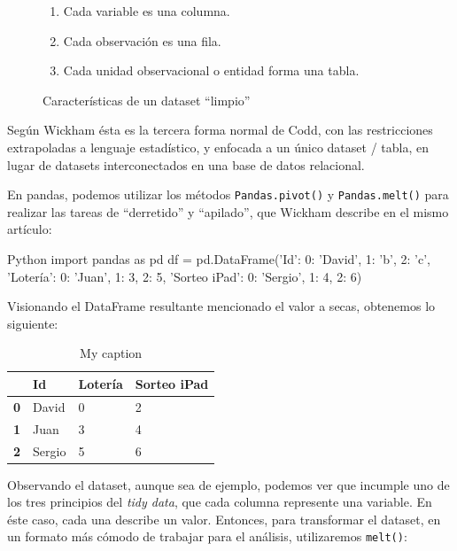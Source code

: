 \begin{figure}[ht!]
  \begin{enumerate}
  \item Cada variable es una columna.
  \item Cada observación es una fila.
  \item Cada unidad observacional o entidad forma una tabla.
  \end{enumerate}
  \caption{\label{fig:tidy-data-characteristics} Características de un
    dataset ``limpio''}
\end{figure}

Según Wickham ésta es la tercera forma normal de Codd, con las restricciones
extrapoladas a lenguaje estadístico, y enfocada a un único dataset / tabla, en
lugar de datasets interconectados en una base de datos relacional.

En pandas, podemos utilizar los métodos \texttt{Pandas.pivot()} y
\texttt{Pandas.melt()} para realizar las tareas de ``derretido'' y ``apilado'',
que Wickham describe en el mismo artículo: 

\vspace{0.5cm}

\begin{TMcode}{Python}{}{}
import pandas as pd
df = pd.DataFrame({'Id': {0: 'David', 1: 'b', 2: 'c'},
                   'Lotería': {0: 'Juan', 1: 3, 2: 5},
                   'Sorteo iPad': {0: 'Sergio', 1: 4, 2: 6}})
\end{TMcode}
\vspace{1cm}

Visionando el DataFrame resultante mencionado el valor a secas, obtenemos lo siguiente: 

\begin{table}[ht!]
\centering
\caption{My caption}
\label{my-label}
\begin{tabular}{|l|l|l|l|}
\hline
           & \textbf{Id} & \textbf{Lotería} & \textbf{Sorteo iPad} \\ \hline
\textbf{0} & David           & 0          & 2          \\ \hline
\textbf{1} & Juan            & 3          & 4          \\ \hline
\textbf{2} & Sergio          & 5          & 6          \\ \hline
\end{tabular}
\end{table}

Observando el dataset, aunque sea de ejemplo, podemos ver que incumple uno de
los tres principios del \emph{tidy data}, que cada columna represente una
variable. En éste caso, cada una describe un valor. Entonces,
para transformar el dataset, en un formato más cómodo de trabajar para el
análisis, utilizaremos  \texttt{melt()}: \vspace{1cm}

